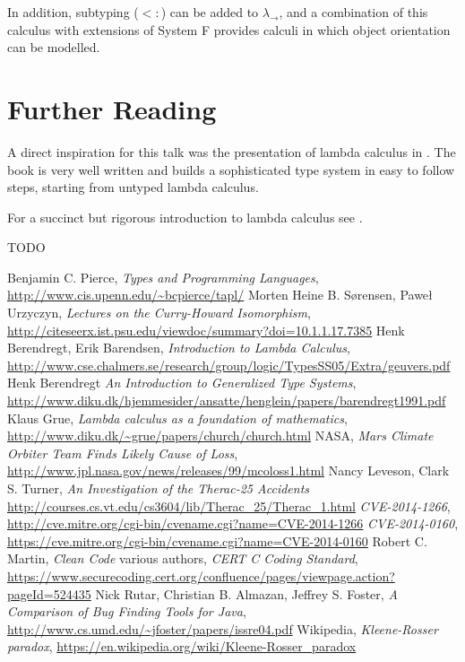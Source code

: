 \documentclass[11pt,twoside,a4paper]{article} %
\begin{document}
In addition, subtyping ($<:$) can be added to $\lambda_\rightarrow$, and a
combination of this calculus with extensions of System F provides calculi in
which object orientation can be modelled.

\section{Further Reading}

A direct inspiration for this talk was the presentation of lambda calculus in
\cite{TAPL}. The book is very well written and builds a sophisticated type
system in easy to follow steps, starting from untyped lambda calculus. 

For a succinct but rigorous introduction to lambda calculus see \cite{bb00}.

TODO

\begin{thebibliography}{9}
 Benjamin C. Pierce, \emph{Types and Programming Languages},
\url{http://www.cis.upenn.edu/~bcpierce/tapl/}
 Morten Heine B. Sørensen, Paweł Urzyczyn, \emph{Lectures on the
Curry-Howard Isomorphism}, 
\url{http://citeseerx.ist.psu.edu/viewdoc/summary?doi=10.1.1.17.7385}
 Henk Berendregt, Erik Barendsen, \emph{Introduction to Lambda
Calculus}, 
\url{http://www.cse.chalmers.se/research/group/logic/TypesSS05/Extra/geuvers.pdf}
 Henk Berendregt \emph{An Introduction to Generalized Type Systems}, 
\url{http://www.diku.dk/hjemmesider/ansatte/henglein/papers/barendregt1991.pdf}
 Klaus Grue, \emph{Lambda calculus as a foundation of mathematics},
\url{http://www.diku.dk/~grue/papers/church/church.html}
 NASA, \emph{Mars Climate Orbiter Team Finds Likely Cause of Loss}, 
\url{http://www.jpl.nasa.gov/news/releases/99/mcoloss1.html}
 Nancy Leveson, Clark S. Turner, 
\emph{An Investigation of the Therac-25 Accidents}
\url{http://courses.cs.vt.edu/cs3604/lib/Therac_25/Therac_1.html}
 \emph{CVE-2014-1266},
\url{http://cve.mitre.org/cgi-bin/cvename.cgi?name=CVE-2014-1266}
 \emph{CVE-2014-0160}, 
\url{https://cve.mitre.org/cgi-bin/cvename.cgi?name=CVE-2014-0160}
 Robert C. Martin, \emph{Clean Code}
 various authors, \emph{CERT C Coding Standard}, 
\url{https://www.securecoding.cert.org/confluence/pages/viewpage.action?pageId=524435}
 Nick Rutar, Christian B. Almazan, Jeffrey S. Foster, \emph{A
Comparison of Bug Finding Tools for Java}, 
\url{http://www.cs.umd.edu/~jfoster/papers/issre04.pdf}
 Wikipedia, \emph{Kleene-Rosser paradox},
\url{https://en.wikipedia.org/wiki/Kleene-Rosser_paradox}
\end{thebibliography}
\end{document}
